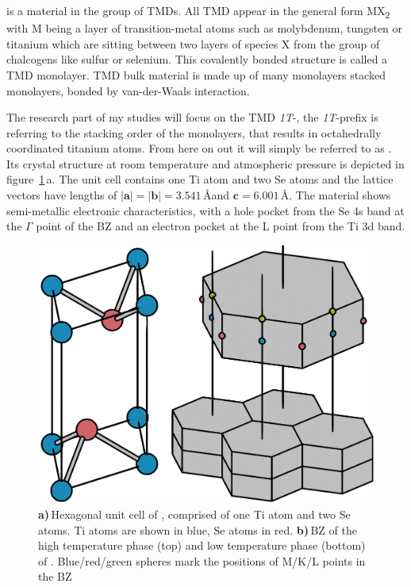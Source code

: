 \ts\space is a material in the group of \acp{TMD}.
All \ac{TMD} appear in the general form MX\textsubscript{2} with M being a layer of transition-metal atoms such as molybdenum, tungsten or titanium which are sitting between two layers of species X from the group of chalcogens like sulfur or selenium.
This covalently bonded structure is called a \ac{TMD} monolayer.
\Ac{TMD} bulk material is made up of many monolayers stacked monolayers, bonded by van-der-Waals interaction.

The research part of my studies will focus on the \ac{TMD} \textit{1T}-\ts, the \textit{1T}-prefix is referring to the stacking order of the monolayers, that results in octahedrally coordinated titanium atoms.
From here on out it will simply be referred to as \ts.
Its crystal structure at room temperature and atmospheric pressure is depicted in figure~\ref{fig:crystal}\,a.
The unit cell contains one Ti atom and two Se atoms and the lattice vectors have lengths of $|\mathbf{a}|=|\mathbf{b}|=3.541$\,\AA\space and $\mathbf{c}=6.001$\,\AA\cite{patel1983}.
The material shows semi-metallic electronic characteristics\cite{bachrach1976}, with a hole pocket from the Se 4s band at the $\Gamma$ point of the \ac{BZ} and an electron pocket at the L point from the Ti 3d band\cite{zunger1978}.

\begin{figure}[!t]
	\begin{minipage}{0.5\columnwidth}
		\includegraphics[width=\columnwidth]{figs/tise2_crystal.png}
	\end{minipage}
	\hspace{0.04\columnwidth}
	\begin{minipage}{0.45\columnwidth}
		\caption{\textbf{a)}\,Hexagonal unit cell of \ts, comprised of one Ti atom and two Se atoms. Ti atoms are shown in blue, Se atoms in red. \textbf{b)}\,\ac{BZ} of the high temperature phase (top) and low temperature phase (bottom) of \ts. Blue/red/green spheres mark the positions of M/K/L points in the \ac{BZ}}
		\label{fig:crystal}
	\end{minipage}
\end{figure}

